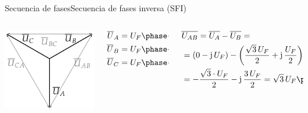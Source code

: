 \documentclass[aspectratio=169, xcolor={usenames,svgnames,dvipsnames}]{beamer}
\begin{document}
\begin{frame}{Secuencia de fases}{Secuencia de fases inversa (SFI)}
\begin{columns}
\begin{column}{0.25\columnwidth}
\begin{center}
\includegraphics[width=\linewidth]{../figs/FasoresTrifasica_ACB.pdf}
\end{center}
\end{column}
\begin{column}{0.25\columnwidth}
\begin{align*}
  \overline{U}_A &= U_F\phase{{\color{blue}\ang{-90}}}\\
  \overline{U}_B &= U_F\phase{\ang{30}}\\
  \overline{U}_C &= U_F\phase{\ang{150}}
\end{align*}
\end{column}
\begin{column}{0.5\columnwidth}
	\begin{align*}
		&\overline{U_{AB}}=\overline{U_{A}}-\overline{U_{B}}=\\&=(0-\mathrm{j}\,U_F)-\left(\dfrac{\sqrt{3}\,U_F}{2}+\mathrm{j}\,\dfrac{U_F}{2}\right)=\\
		&=-\dfrac{\sqrt{3}\cdot U_F}{2}-\mathrm{j}\,\dfrac{3\,U_F}{2}=\sqrt{3}\,U_F \phase{-120^\circ}
	\end{align*}
\end{column}
\end{columns}


\end{frame}
\end{document}
